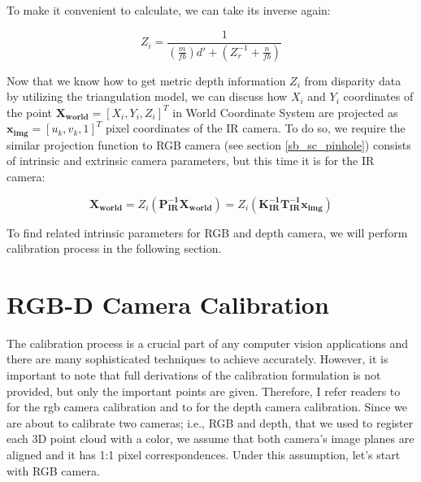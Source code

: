 \documentclass[a4paper]{report}
\numberwithin{figure}{section}
\begin{document}
To make it convenient to calculate, we can take its inverse again:

\begin{equation}
  Z_i = \frac{1}{(\frac{m}{fb})d' + (Z_r^{-1} + \frac{n}{fb})}
\end{equation}\label{eq:depth_w_disparity}

Now that we know how to get metric depth information $Z_i$ from disparity data by 
utilizing the triangulation model, we can discuss 
how
$X_i$ and $Y_i$ 
coordinates of the point $\mathbf{X_{world}}=[X_i, Y_i, Z_i]^T$ in World Coordinate System
are projected as $\mathbf{x_{img}}=[u_k,v_k,1]^T$ pixel coordinates of the IR camera. 
To do so, we require the similar projection function to RGB camera 
(see section \ref{sb_sc_pinhole})
consists of intrinsic and extrinsic camera parameters, but this time it is for 
the IR camera:

\begin{equation}
  \mathbf{X_{world}} =
  Z_i (\mathbf{P_{IR}^{-1}}\mathbf{X_{world}}) = 
  Z_i (\mathbf{K_{IR}^{-1}}\mathbf{T_{IR}^{-1}}\mathbf{x_{img}})
\end{equation} \label{eq:ir_cam_proj_func}


%

To find related intrinsic parameters for RGB and depth camera, we will perform 
calibration process in the following section.

\section{RGB-D Camera Calibration} \label{sb_sc_rgb_calibration}

The calibration process is a crucial part of any computer vision applications 
and there are many sophisticated techniques to achieve accurately.
However, it is important to note that full derivations of the calibration formulation 
is not provided, but only the important points are given.
Therefore, I refer readers to \cite{bla} for the rgb camera calibration and 
to \cite{bla} for the depth camera calibration. 
Since we are about to calibrate two cameras; i.e., RGB and depth, that we 
used to register each 3D point cloud with a color, we assume that both camera's image 
planes are aligned and it has 1:1 pixel correspondences. Under this assumption,
let's start with RGB camera.
\end{document}
